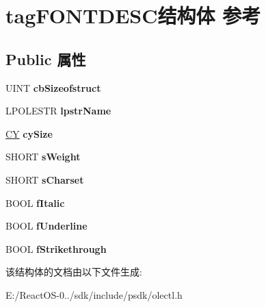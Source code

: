 \hypertarget{structtag_f_o_n_t_d_e_s_c}{}\section{tag\+F\+O\+N\+T\+D\+E\+S\+C结构体 参考}
\label{structtag_f_o_n_t_d_e_s_c}
\subsection*{Public 属性}
\begin{DoxyCompactItemize}
\item 
\mbox{\label{structtag_f_o_n_t_d_e_s_c_a528c5b63b519cef173c15b3800097d46}} 
U\+I\+NT {\bfseries cb\+Sizeofstruct}
\item 
\mbox{\label{structtag_f_o_n_t_d_e_s_c_ad4c1fc097d46907e59e26e5695fe23db}} 
L\+P\+O\+L\+E\+S\+TR {\bfseries lpstr\+Name}
\item 
\mbox{\label{structtag_f_o_n_t_d_e_s_c_ac11e46cc9a60cc1f0ee0c73a60ead4f6}} 
\hyperlink{uniontag_c_y}{CY} {\bfseries cy\+Size}
\item 
\mbox{\label{structtag_f_o_n_t_d_e_s_c_a6dba6e1ea9d7fd6c43df41dbac6c1f6b}} 
S\+H\+O\+RT {\bfseries s\+Weight}
\item 
\mbox{\label{structtag_f_o_n_t_d_e_s_c_abf95f22ad94b326a1bc3ebd2c921e802}} 
S\+H\+O\+RT {\bfseries s\+Charset}
\item 
\mbox{\label{structtag_f_o_n_t_d_e_s_c_aa778f4340622207f28bfc659fc1814fd}} 
B\+O\+OL {\bfseries f\+Italic}
\item 
\mbox{\label{structtag_f_o_n_t_d_e_s_c_ab319d0a2daf0d7251f36df153f32e4ee}} 
B\+O\+OL {\bfseries f\+Underline}
\item 
\mbox{\label{structtag_f_o_n_t_d_e_s_c_ab7ea2a601839e5da75abb2d7944852f1}} 
B\+O\+OL {\bfseries f\+Strikethrough}
\end{DoxyCompactItemize}


该结构体的文档由以下文件生成\+:\begin{DoxyCompactItemize}
\item 
E\+:/\+React\+O\+S-\/0../sdk/include/psdk/olectl.\+h\end{DoxyCompactItemize}
